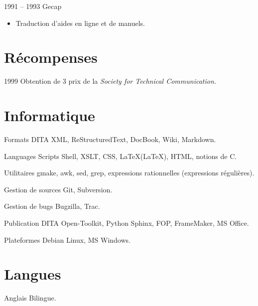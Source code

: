 \documentclass[12pt,a4paper,roman]{moderncv}
\begin{document}
\cventry
    {1991 – 1993}
    {Gecap}
    {}
    {}
    {}
    {
      \begin{itemize}
      \item Traduction d'aides en ligne et de manuels.
      \end{itemize}
    }


\section{Récompenses}

\cvitem
    {1999}
    {Obtention de 3 prix de la \textit{Society for Technical Communication.}}


\section{Informatique}

\cvitem
    {Formats}
    {DITA XML, ReStructuredText, DocBook, Wiki, Markdown.}

\cvitem
    {Languages}
    {Scripts Shell, XSLT, CSS, \LaTeX (LaTeX), HTML, notions de C.}

\cvitem
    {Utilitaires}
    {gmake, awk, sed, grep, expressions rationnelles (expressions régulières).}

\cvitem
    {Gestion de sources}
    {Git, Subversion.}

\cvitem
    {Gestion de bugs}
    {Bugzilla, Trac.}

\cvitem
    {Publication}
    {DITA Open-Toolkit, Python Sphinx, FOP, FrameMaker, MS Office.}

\cvitem
    {Plateformes}
    {Debian Linux, MS Windows.}

\section{Langues}

\cvitem
    {Anglais}
    {Bilingue.}
\end{document}
